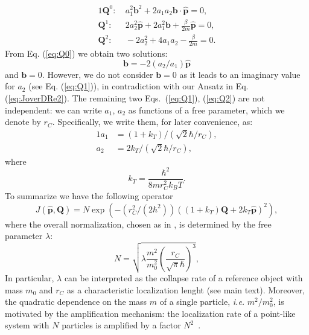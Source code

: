 \documentclass[prl,twocolumn,showpacs,superscriptaddress,groupedaddress]{revtex4}
\begin{document}
\begin{alignat}{1}
\bm{Q}^{0}: & \:a_{1}^{2}\bm{b}^{2}+2a_{1}a_{2}\bm{b}\cdot\hat{\bm{p}}=0,\label{eq:Q0}\\
\bm{Q}^{1}: & \:2a_{2}^{2}\hat{\bm{p}}+2a_{1}^{2}\bm{b}+\frac{\beta}{2m}\hat{\bm{p}}=0,\label{eq:Q1}\\
\bm{Q}^{2}: & \:-2a_{2}^{2}+4a_{1}a_{2}-\frac{\beta}{2m}=0.\label{eq:Q2}
\end{alignat}
From Eq. (\ref{eq:Q0}) we obtain two solutions:
\begin{equation}
\bm{b}=-2(a_{2}/a_{1})\hat{\bm{p}}\label{eq:b}
\end{equation}
and $\bm{b}=0$. However, we do not consider $\bm{b}=0$ as it leads to an imaginary value for $a_{2}$ (see Eq. (\ref{eq:Q1})), in contradiction with our Ansatz in Eq. (\ref{eq:JoverDRe2}). The remaining two Eqs.~(\ref{eq:Q1}), (\ref{eq:Q2}) are not independent: we can write $a_{1}$, $a_{2}$ as functions of a free parameter, which we denote by $r_{C}$. Specifically, we write them, for later convenience, as:
\begin{alignat}{1}
a_{1} & =(1+k_{T})/(\sqrt{2}\hbar/r_{C}),\label{eq:a1}\\
a_{2} & =2k_{T}/(\sqrt{2}\hbar/r_{C}),\label{eq:a2}
\end{alignat}
where 
\begin{equation}
k_{T}=\frac{\hbar^{2}}{8mr_{C}^{2}k_{B}T}.
\end{equation}
To summarize we have the following operator
\begin{equation}
J(\hat{\bm{p}},\bm{Q})=N\exp(-(r_{C}^{2}/(2\hbar^{2}))((1+k_{T})\bm{Q}+2k_{T}\hat{\bm{p}})^{2}),
\label{eq:JoperatorRe2}
\end{equation}
where the overall normalization, chosen as in \cite{Smirne:2014paa},
is determined by the free parameter $\lambda$:
\begin{equation}
N=\sqrt{\lambda\frac{m^{2}}{m_{0}^{2}}\left(\frac{r_{C}}{\sqrt{\pi}\hbar}\right)^{3}},
\end{equation}
In particular, $\lambda$ can be interpreted as the collapse rate of a reference object with mass $m_0$ and $r_C$ as a characteristic localization lenght (see main text). Moreover, the quadratic dependence on the mass $m$ of a single particle, \textit{i.e.} $m^{2}/m_{0}^{2}$, is motivated by the amplification mechanism: the localization rate of a point-like system with $N$ particles is amplified by a factor $N^2$~\cite{collapse_review1}.
\end{document}
